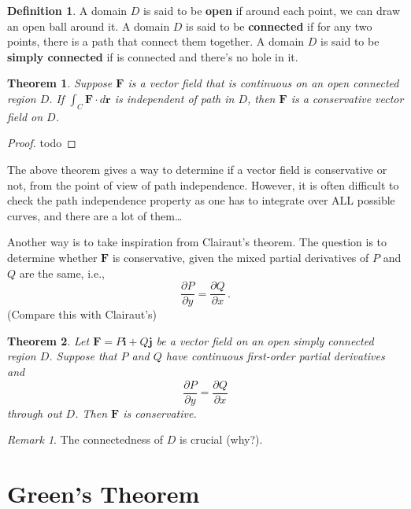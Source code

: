 \documentclass[
]{book}
\newtheorem{theorem}{Theorem}[chapter]
\theoremstyle{definition}
\newtheorem{definition}{Definition}[chapter]
\theoremstyle{definition}
\theoremstyle{definition}
\theoremstyle{definition}
\theoremstyle{remark}
\newtheorem*{remark}{Remark}
\begin{document}
\begin{definition}
A domain \(D\) is said to be \textbf{open} if around each point, we can draw an open ball around it.
A domain \(D\) is said to be \textbf{connected} if for any two points, there is a path that connect them
together.
A domain \(D\) is said to be \textbf{simply connected} if is connected and there's no hole in it.
\end{definition}

\begin{theorem}
Suppose \(\mathbf{F}\) is a vector field that is continuous on an open
connected region \(D\).
If \(\int_C \mathbf{F} \cdot d \mathbf{r}\) is independent of path in \(D\),
then \(\mathbf{F}\) is a conservative vector field on \(D\).
\end{theorem}

\begin{proof}
todo
\end{proof}

The above theorem gives a way to determine if a vector field is conservative or not, from
the point of view of path independence.
However, it is often difficult to check the path independence property as one has to
integrate over ALL possible curves, and there are a lot of them\ldots{}

Another way is to take inspiration from Clairaut's theorem.
The question is to determine whether \(\mathbf{F}\) is conservative, given the mixed partial
derivatives of \(P\) and \(Q\) are the same, i.e.,
\begin{equation*}
    \frac{\partial P}{\partial y} = \frac{\partial Q}{\partial x}\,.
\end{equation*}
(Compare this with Clairaut's)

\begin{theorem}
Let \(\mathbf{F} = P\mathbf{i} + Q\mathbf{j}\) be a vector field on an open simply connected
region \(D\). Suppose that
\(P\) and \(Q\) have continuous first-order partial derivatives and
\begin{equation*}
    \frac{\partial P}{\partial y} = \frac{\partial Q}{\partial x}
\end{equation*}
through out \(D\).
Then \(\mathbf{F}\) is conservative.
\end{theorem}

\begin{remark}
The connectedness of \(D\) is crucial (why?).
\end{remark}

\hypertarget{greens-theorem}{%
\section{Green's Theorem}\label{greens-theorem}}
\end{document}
